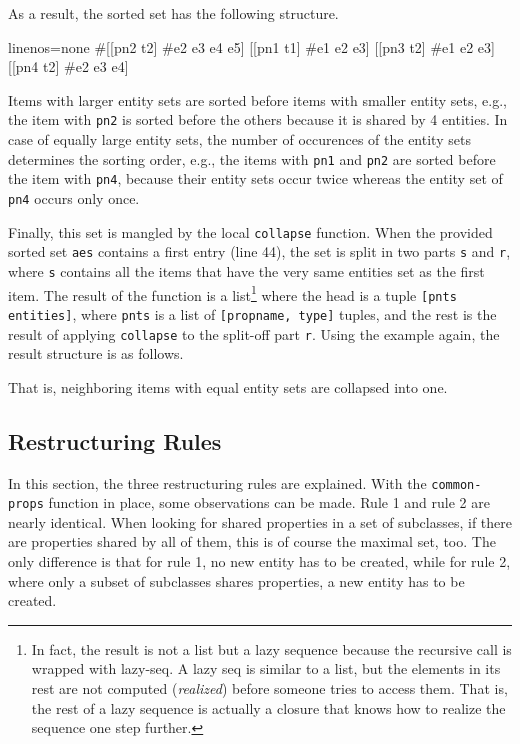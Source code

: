 \documentclass[11pt]{article}
\begin{document}
As a result, the sorted set has the following structure.

\begin{clojurecode*}{linenos=none}
#{[[pn2 t2] #{e2 e3 e4 e5}]
  [[pn1 t1] #{e1 e2 e3}]
  [[pn3 t2] #{e1 e2 e3}]
  [[pn4 t2] #{e2 e3 e4}]}
\end{clojurecode*}

Items with larger entity sets are sorted before items with smaller entity sets,
e.g., the item with \verb|pn2| is sorted before the others because it is shared
by 4 entities.  In case of equally large entity sets, the number of occurences
of the entity sets determines the sorting order, e.g., the items with
\verb|pn1| and \verb|pn2| are sorted before the item with \verb|pn4|, because
their entity sets occur twice whereas the entity set of \verb|pn4| occurs only
once.

Finally, this set is mangled by the local \verb|collapse| function.  When the
provided sorted set \verb|aes| contains a first entry (line 44), the set is
split in two parts \verb|s| and \verb|r|, where \verb|s| contains all the items
that have the very same entities set as the first item.  The result of the
function is a list\footnote{In fact, the result is not a list but a lazy
  sequence because the recursive call is wrapped with \textsf{lazy-seq}.  A
  lazy seq is similar to a list, but the elements in its rest are not computed
  (\emph{realized}) before someone tries to access them.  That is, the rest of
  a lazy sequence is actually a closure that knows how to realize the sequence
  one step further.}  where the head is a tuple \verb|[pnts entities]|, where
\verb|pnts| is a list of \verb|[propname, type]| tuples, and the rest is the
result of applying \verb|collapse| to the split-off part \verb|r|.  Using the
example again, the result structure is as follows.

\begin{clojurecode*}{linenos=none}
([([pn2 t2])          #{e2 e3 e4 e5}]
 [([pn1 t1] [pn3 t2]) #{e1 e2 e3}]
 [([pn4 t2])          #{e2 e3 e4}]}
\end{clojurecode*}

That is, neighboring items with equal entity sets are collapsed into one.


\subsection{Restructuring Rules}
\label{sec:restructuring-rules}

In this section, the three restructuring rules are explained.  With the
\verb|common-props| function in place, some observations can be made.  Rule 1
and rule 2 are nearly identical.  When looking for shared properties in a set
of subclasses, if there are properties shared by all of them, this is of course
the maximal set, too.  The only difference is that for rule 1, no new entity
has to be created, while for rule 2, where only a subset of subclasses shares
properties, a new entity has to be created.
\end{document}
